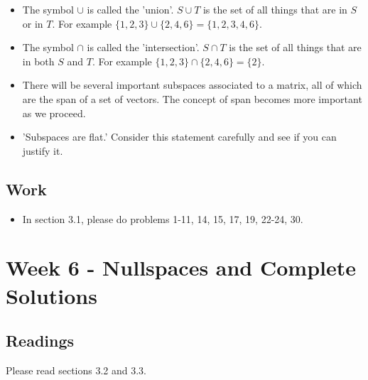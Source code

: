 \begin{itemize}
			\item The symbol $\cup$ is called the 'union'. $S\cup T$ is the set of all things that are in $S$ or in $T$. For example $\{1,2,3\} \cup \{2,4,6 \} = \{1,2,3,4,6 \}$.
			\item The symbol $\cap$ is called the 'intersection'. $S\cap T$ is the set of all things that are in both $S$ and $T$. For example $\{1,2,3\} \cap \{2,4,6 \} = \{2 \}$.
			\item There will be several important subspaces associated to a matrix, all of which are the span of a set of vectors. The concept of span becomes more important as we proceed.
			\item 'Subspaces are flat.' Consider this statement carefully and see if you can justify it.
		\end{itemize}

	\subsection{Work}
		\begin{itemize}
			\item In section 3.1, please do problems 1-11, 14, 15, 17, 19, 22-24, 30.
		\end{itemize}

	\clearpage



	\section{Week 6 - Nullspaces and Complete Solutions}

	\subsection{Readings}
		Please read sections 3.2 and 3.3.

